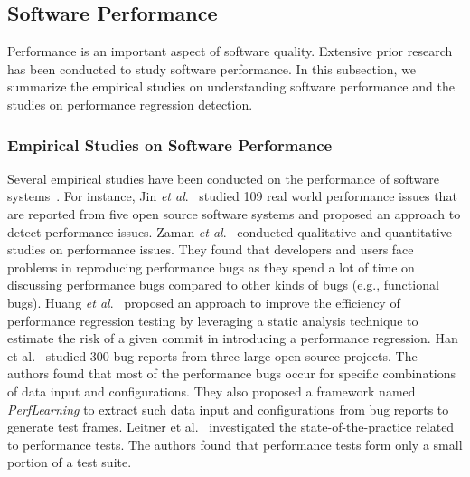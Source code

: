 \subsection{Software Performance}

Performance is an important aspect of software quality. Extensive prior research has been conducted to study software performance. In this subsection, we summarize the empirical studies on  %
understanding software performance and the studies on %
performance regression detection.

\subsubsection{Empirical Studies on Software Performance}
Several empirical studies have been conducted on the performance of software systems~\cite{ICSE2014:Huang,Jin:2012,MSR11:Zaman,MSR12:Zaman,DBLP:conf/kbse/HanYL18,Leitner2017ICPE}. For instance, Jin \emph{et al$.$}~\cite{Jin:2012} studied 109 real world performance issues that are reported from five open source software systems and %
proposed an approach to detect performance issues. Zaman \emph{et al$.$}~\cite{MSR11:Zaman,MSR12:Zaman} conducted qualitative and quantitative studies on performance issues. They found that developers and users face problems in reproducing performance bugs %
as they spend %
a lot of time on discussing performance bugs %
compared to other kinds of bugs (e.g., functional bugs). %
Huang \emph{et al$.$}~\cite{ICSE2014:Huang} %
proposed an approach to improve the efficiency of performance regression testing by leveraging a static analysis technique to estimate the risk of a given commit in introducing a performance regression. Han et al$.$~\cite{DBLP:conf/kbse/HanYL18} studied %
300 bug reports from three large open source projects. The authors found that most of the performance bugs occur for specific combinations of data input and configurations. They also proposed a framework named \emph{PerfLearning} to extract such data input and configurations from bug reports to generate test frames. Leitner et al$.$~\cite{Leitner2017ICPE} %
investigated the state-of-the-practice related to performance tests. The authors found that performance tests form only a small portion of a test suite.

